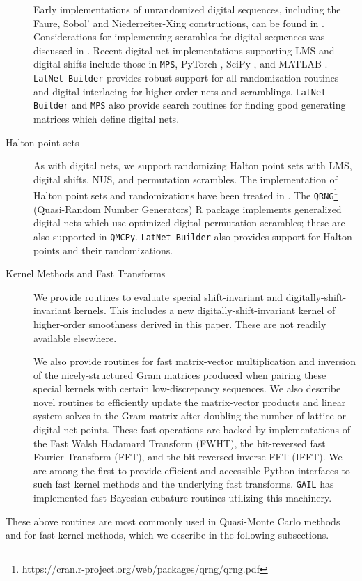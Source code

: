 \documentclass[acmsmall]{acmart}
\begin{document}
\begin{description}
    Early implementations of unrandomized digital sequences, including the Faure, Sobol' and Niederreiter-Xing constructions, can be found in \citep{fox1986algorithm,bratley1992implementation,bratley2003implementing,pirsic2002software}. Considerations for implementing scrambles for digital sequences was discussed in \citep{hong2003algorithm}. Recent digital net implementations supporting LMS and digital shifts  include those in \texttt{MPS}, PyTorch \citep{paszke2019pytorch}, SciPy \citep{virtanen2020scipy}, and MATLAB \citep{MATLAB}. \texttt{LatNet Builder} provides robust support for all randomization routines and digital interlacing for higher order nets and scramblings. \texttt{LatNet Builder} and \texttt{MPS} also provide search routines for finding good generating matrices which define digital nets. 
    \item[Halton point sets] As with digital nets, we support randomizing Halton point sets with LMS, digital shifts, NUS, and permutation scrambles. The implementation of Halton point sets and randomizations have been treated in \citep{owen_halton,wang2000randomized}. The \texttt{QRNG}\footnote{https://cran.r-project.org/web/packages/qrng/qrng.pdf} (Quasi-Random Number Generators) R package \citep{qrng.software} implements generalized digital nets which use optimized digital permutation scrambles; these are also supported in \texttt{QMCPy}. \texttt{LatNet Builder} also provides support for Halton points and their randomizations. 
    \item[Kernel Methods and Fast Transforms] We provide routines to evaluate special shift-invariant and digitally-shift-invariant kernels. This includes a new digitally-shift-invariant kernel of higher-order smoothness derived in this paper. These are not readily available elsewhere. 
    
    We also provide routines for fast matrix-vector multiplication and inversion of the nicely-structured Gram matrices produced when pairing these special kernels with certain low-discrepancy sequences. We also describe novel routines to efficiently update the matrix-vector products and linear system solves in the Gram matrix after doubling the number of lattice or digital net points. These fast operations are backed by implementations of the Fast Walsh Hadamard Transform (FWHT), the bit-reversed fast Fourier Transform (FFT), and the bit-reversed inverse FFT (IFFT). We are among the first to provide efficient and accessible Python interfaces to such fast kernel methods and the underlying fast transforms. \texttt{GAIL} has implemented fast Bayesian cubature routines utilizing this machinery. 
\end{description}
These above routines are most commonly used in Quasi-Monte Carlo methods and for fast kernel methods, which we describe in the following subsections. 
\end{document}
